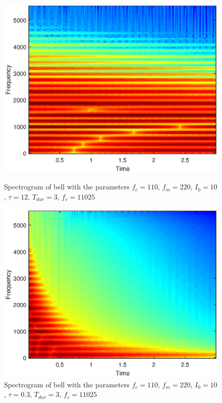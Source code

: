 \documentclass{article}
\begin{document}
\begin{figure}[H]
	\centering
	\begin{minipage}{0.3\linewidth}
		\includegraphics[scale=0.3]{spec3}
		\caption{Spectrogram of bell with the parameters $f_c = 110$, $f_m = 220$, $I_0 = 10$, $\tau = 12$, $T_{dur} = 3$, $f_s = 11025$}
	\end{minipage}
	\hspace{4cm}
	\begin{minipage}{0.3\linewidth}
		\includegraphics[scale=0.3]{spec4}
		\caption{Spectrogram of bell with the parameters $f_c = 110$, $f_m = 220$, $I_0 = 10$, $\tau = 0.3$, $T_{dur} = 3$, $f_s = 11025$}
	\end{minipage}
\end{figure}
\end{document}
